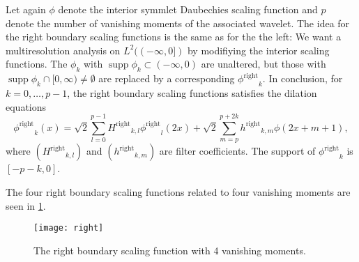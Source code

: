 \documentclass[a4paper]{scrartcl}
\newcommand\rphi{\ensuremath{\phi^{\text{right}}}}
\newcommand\rH{\ensuremath{H^{\text{right}}}}
\newcommand\rh{\ensuremath{h^{\text{right}}}}
\DeclareMathOperator\supp{supp}
\begin{document}
Let again $\phi$ denote the interior symmlet Daubechies scaling function and $p$ denote the number of vanishing moments of the associated wavelet.
The idea for the right boundary scaling functions is the same as for the the left:
We want a multiresolution analysis on $L^2((-\infty,0])$ by modifiying the interior scaling functions.
The $\phi_k$ with $\supp\phi_k \subset (-\infty,0)$ are unaltered, but those with $\supp\phi_k \cap [0, \infty) \neq \emptyset$ are replaced by a corresponding $\rphi_k$.
In conclusion, for $k=0,\ldots,p-1$, the right boundary scaling functions satisfies the dilation equations
\begin{equation}
	\label{eq:right_scaling_function_definition}
	\rphi_k(x)
	= \sqrt2 \sum_{l=0}^{p-1} \rH_{k,l} \rphi_l(2x) + \sqrt2 \sum_{m=p}^{p+2k} \rh_{k,m} \phi(2x+m+1),
\end{equation}
where $(\rH_{k,l})$ and $(\rh_{k,m})$ are filter coefficients.
The support of $\rphi_k$ is $[-p-k,0]$.

The four right boundary scaling functions related to four vanishing moments are seen in \cref{fig:right_Daubechies4}.

\begin{figure}
	\centering
	\texttt{[image: right]}
	\caption{The right boundary scaling function with 4 vanishing moments.}
	\label{fig:right_Daubechies4}
\end{figure}


\printbibliography
\end{document}
